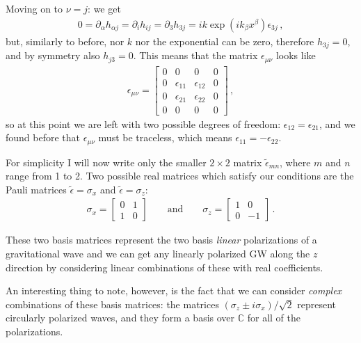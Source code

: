 \documentclass[main.tex]{subfiles}
\begin{document}
Moving on to \(\nu = j \): we get 
%
\begin{align}
0 = \partial_{\alpha } h_{\alpha j} = \partial_{i } h_{ij} = \partial_{3} h_{3 j} = ik \exp(ik_{\beta } x^{\beta } ) \epsilon_{3j}
\,,
\end{align}
%
but, similarly to before, nor \(k\) nor the exponential can be zero, therefore \(h_{3j}=0\), and by symmetry also \(h_{j3}=0\). This means that the matrix \(\epsilon_{\mu \nu }\) looks like 
%
\begin{subequations}
\begin{align}
\epsilon_{\mu \nu } = \left[\begin{array}{cccc}
0 & 0 & 0 & 0 \\ 
0 & \epsilon_{11} & \epsilon_{12} & 0 \\ 
0 & \epsilon_{21} & \epsilon_{22} & 0 \\ 
0 & 0 & 0 & 0
\end{array}\right]
\,,
\end{align}
\end{subequations}
%
so at this point we are left with two possible degrees of freedom: \(\epsilon_{12} = \epsilon_{21}\), and we found before that \(\epsilon_{\mu \nu }\) must be traceless, which means \(\epsilon_{11} = - \epsilon_{22}\). 

For simplicity I will now write only the smaller \(2 \times 2\) matrix \(\widetilde{\epsilon}_{mn}\), where \(m\) and \(n\) range from 1 to 2. Two possible real matrices which satisfy our conditions are the Pauli matrices \(\widetilde{\epsilon}=   \sigma_{x} \) and \( \widetilde{\epsilon} = \sigma_{z}\): 
%
\begin{subequations}
\begin{align}
\sigma_{x} = \left[\begin{array}{cc}
0 & 1 \\ 
1 & 0
\end{array}\right] \qquad \text{and} \qquad
\sigma_{z} = \left[\begin{array}{cc}
1 & 0 \\ 
0 & -1
\end{array}\right]
\,.
\end{align}
\end{subequations}

These two basis matrices represent the two basis \emph{linear} polarizations of a gravitational wave and we can get any linearly polarized GW along the \(z\) direction by considering linear combinations of these with real coefficients. 

An interesting thing to note, however, is the fact that we can consider \emph{complex} combinations of these basis matrices: the matrices \((\sigma_{z} \pm i \sigma_{x} ) / \sqrt{2}\) represent circularly polarized waves, and they form a basis over \(\mathbb{C}\) for all of the polarizations. 
\end{document}
